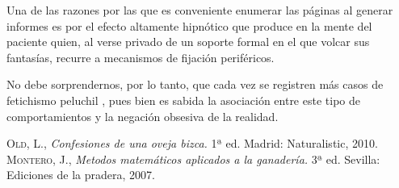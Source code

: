 \documentclass{article}
\begin{document}
Una de las razones por las que es conveniente enumerar las páginas 
al generar informes es por el efecto altamente hipnótico que produce 
en la mente del paciente quien, al verse privado de un soporte formal 
en el que volcar sus fantasías, recurre a mecanismos de fijación 
periféricos.\cite{pradery}

No debe sorprendernos, por lo tanto, que cada vez  se registren más casos 
de fetichismo peluchil \cite{old}, pues bien es sabida la asociación entre 
este tipo de comportamientos y la negación obsesiva de la realidad.

\begin{thebibliography}{aaaa}
 \textsc{Old, L.},
\textit{Confesiones de una oveja bizca.}
1ª ed. Madrid: Naturalistic, 2010. 
 \textsc{Montero, J.},
\textit{Metodos matemáticos aplicados a la ganadería.}
3ª ed. Sevilla: Ediciones de la pradera, 2007.  
\end{thebibliography}
\end{document}
